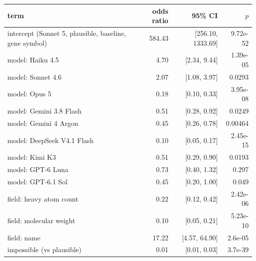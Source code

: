 \begin{tabular}{lrrr}
\toprule
term & odds ratio & 95\% CI & $p$ \\
\midrule
intercept (Sonnet 5, plausible, baseline, gene symbol) & 584.43 & [256.10, 1333.69] & 9.72e-52 \\
model: Haiku 4.5 & 4.70 & [2.34, 9.44] & 1.39e-05 \\
model: Sonnet 4.6 & 2.07 & [1.08, 3.97] & 0.0293 \\
model: Opus 5 & 0.18 & [0.10, 0.33] & 3.95e-08 \\
model: Gemini 3.8 Flash & 0.51 & [0.28, 0.92] & 0.0249 \\
model: Gemini 4 Argon & 0.45 & [0.26, 0.78] & 0.00464 \\
model: DeepSeek V4.1 Flash & 0.10 & [0.05, 0.17] & 2.45e-15 \\
model: Kimi K3 & 0.51 & [0.29, 0.90] & 0.0193 \\
model: GPT-6 Luna & 0.73 & [0.40, 1.32] & 0.297 \\
model: GPT-6.1 Sol & 0.45 & [0.20, 1.00] & 0.049 \\
field: heavy atom count & 0.22 & [0.12, 0.42] & 2.42e-06 \\
field: molecular weight & 0.10 & [0.05, 0.21] & 5.23e-10 \\
field: name & 17.22 & [4.57, 64.90] & 2.6e-05 \\
impossible (vs plausible) & 0.01 & [0.01, 0.03] & 3.7e-39 \\
\bottomrule
\end{tabular}
